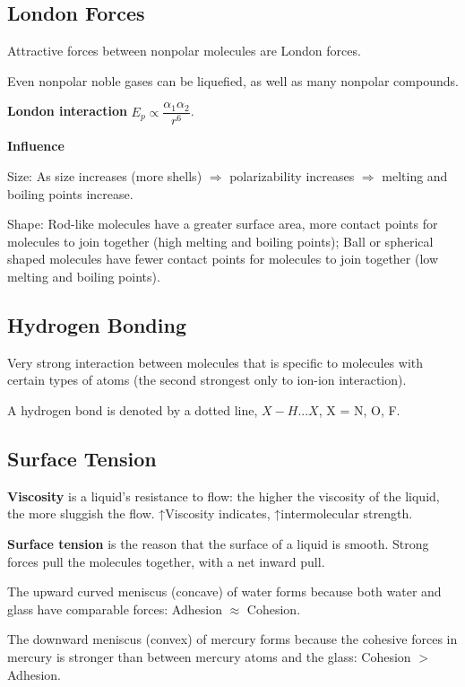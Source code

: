 \documentclass[a4paper,12pt]{article}
\begin{document}
\subsection{London Forces}
Attractive forces between nonpolar molecules are London forces.\par
Even nonpolar noble gases can be liquefied, as well as many nonpolar compounds.\par
\textbf{London interaction} $E_{p} \propto \dfrac{\alpha_{1}\alpha_{2}}{r^{6}}$.\par
\textbf{Influence}\par
Size: As size increases (more shells) $\Rightarrow$ polarizability increases $\Rightarrow$ melting and boiling points increase.\par
Shape: Rod-like molecules have a greater surface area, more contact points for molecules to join together (high melting and boiling points); Ball or spherical shaped molecules have fewer contact points for molecules to join together (low melting and boiling points).
\subsection{Hydrogen Bonding}
Very strong interaction between molecules that is specific to molecules with certain types of atoms (the second strongest only to ion-ion interaction).\par
A hydrogen bond is denoted by a dotted line, $X-H...X$, X = N, O, F.
\subsection{Surface Tension}
\textbf{Viscosity} is a liquid’s resistance to flow: the higher the viscosity of the liquid,
the more sluggish the flow. ↑Viscosity indicates, ↑intermolecular strength.\par
\textbf{Surface tension} is the reason that the surface of a liquid is smooth. Strong forces pull the molecules together, with a net inward pull.\par
The upward curved meniscus (concave) of water forms because both water and glass have comparable forces: Adhesion $\approx$ Cohesion.\par
The downward meniscus (convex) of mercury forms because the cohesive forces in mercury is stronger than between mercury atoms and the glass: Cohesion $>$ Adhesion.























\newpage
\end{document}
